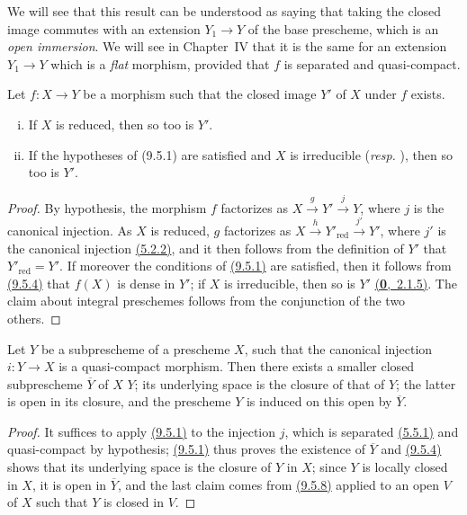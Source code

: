We will see that this result can be understood as saying that taking the closed image commutes with an extension $Y_1\to Y$ of the base prescheme, which is an {\em open immersion}.
We will see in Chapter~IV that it is the same for an extension $Y_1\to Y$ which is a {\em flat} morphism, provided that $f$ is separated and quasi-compact.

\begin{prop}[9.5.9]
\label{prop-1.9.5.9}
Let $f\colon X\to Y$ be a morphism such that the closed image $Y'$ of $X$ under $f$ exists.
\begin{enumerate}[(i)]
    \item If $X$ is reduced, then so too is $Y'$.
    \item If the hypotheses of (9.5.1) are satisfied and $X$ is irreducible (\emph{resp.} ), then so too is $Y'$.
\end{enumerate}
\end{prop}

\begin{proof}
\label{proof-prop-1.9.5.9}
By hypothesis, the morphism $f$ factorizes as $X\xrightarrow{g}Y'\xrightarrow{j}Y$, where $j$ is the canonical injection.
As $X$ is reduced, $g$ factorizes as $X\xrightarrow{h}Y'_\mathrm{red}\xrightarrow{j'}Y'$, where $j'$ is the canonical injection \hyperref[prop-1.5.2.2]{(5.2.2)}, and it then follows from the definition of $Y'$ that $Y'_\mathrm{red}=Y'$.
If moreover the conditions of \hyperref[prop-1.5.9.1]{(9.5.1)} are satisfied, then it follows from \hyperref[prop-1.9.5.4]{(9.5.4)} that $f(X)$ is dense in $Y'$; if $X$ is irreducible, then so is $Y'$ \hyperref[env-0.2.1.5]{(\textbf{0},~2.1.5)}.
The claim about integral preschemes follows from the conjunction of the two others.
\end{proof}

\begin{prop}[9.5.10]
\label{prop-1.9.5.10}
Let $Y$ be a subprescheme of a prescheme $X$, such that the canonical injection $i:Y\to X$ is a quasi-compact morphism.
Then there exists a smaller closed subprescheme $\overline{Y}$ of $X$  $Y$; its underlying space is the closure of that of $Y$; the latter is open in its closure, and the prescheme $Y$ is induced on this open by $\overline{Y}$.
\end{prop}

\begin{proof}
\label{proof-prop-1.9.5.10}
It suffices to apply \hyperref[prop-1.5.9.1]{(9.5.1)} to the injection $j$, which is separated \hyperref[prop-1.5.5.1]{(5.5.1)} and quasi-compact by hypothesis; \hyperref[prop-1.5.9.1]{(9.5.1)} thus proves the existence of $\overline{Y}$ and \hyperref[prop-1.5.9.4]{(9.5.4)} shows that its underlying space is the closure of $Y$ in $X$; since $Y$ is locally closed in $X$, it is open in $\overline{Y}$, and the last claim comes from \hyperref[prop-1.5.9.8]{(9.5.8)} applied to an open $V$ of $X$ such that $Y$ is closed in $V$.
\end{proof}

